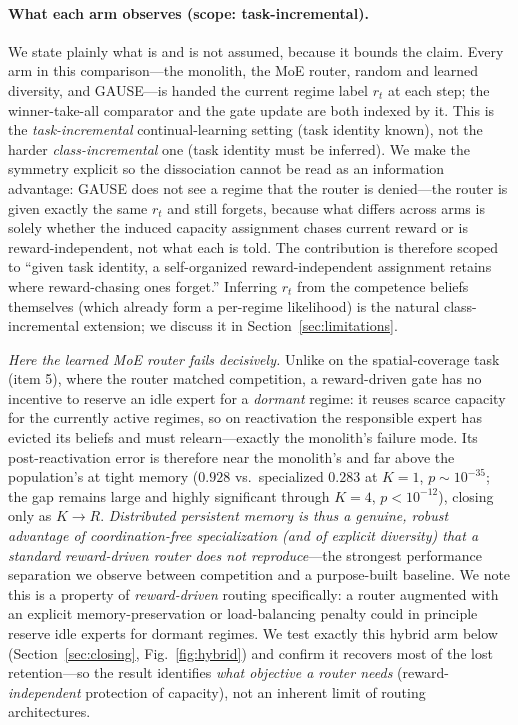 \documentclass{article}
\begin{document}
\paragraph{What each arm observes (scope: task-incremental).} We state plainly
what is and is not assumed, because it bounds the claim. Every arm in this
comparison---the monolith, the MoE router, random and learned diversity, and
GAUSE---is handed the current regime label $r_t$ at each step; the winner-take-all
comparator and the gate update are both indexed by it. This is the
\emph{task-incremental} continual-learning setting (task identity known), not the
harder \emph{class-incremental} one (task identity must be inferred). We make the
symmetry explicit so the dissociation cannot be read as an information advantage:
GAUSE does not see a regime that the router is denied---the router is given exactly
the same $r_t$ and still forgets, because what differs across arms is solely whether
the induced capacity assignment chases current reward or is reward-independent, not
what each is told. The contribution is therefore scoped to ``given task identity, a
self-organized reward-independent assignment retains where reward-chasing ones
forget.'' Inferring $r_t$ from the competence beliefs themselves (which already form
a per-regime likelihood) is the natural class-incremental extension; we discuss it
in Section~\ref{sec:limitations}.

\emph{Here the learned MoE router fails decisively.} Unlike on the spatial-coverage
task (item 5), where the router matched competition, a reward-driven gate has no
incentive to reserve an idle expert for a \emph{dormant} regime: it reuses scarce
capacity for the currently active regimes, so on reactivation the responsible expert
has evicted its beliefs and must relearn---exactly the monolith's failure mode. Its
post-reactivation error is therefore near the monolith's and far above the
population's at tight memory ($0.928$ vs.\ specialized $0.283$ at $K{=}1$,
$p\sim10^{-35}$; the gap remains large and highly significant through $K{=}4$,
$p<10^{-12}$), closing only as $K\to R$. \emph{Distributed persistent memory is thus
a genuine, robust advantage of coordination-free specialization (and of explicit
diversity) that a standard reward-driven router does not reproduce}---the strongest
performance separation we observe between competition and a purpose-built baseline.
We note this is a property of \emph{reward-driven} routing specifically: a router
augmented with an explicit memory-preservation or load-balancing penalty could in
principle reserve idle experts for dormant regimes. We test exactly this hybrid arm
below (Section~\ref{sec:closing}, Fig.~\ref{fig:hybrid}) and confirm it recovers most
of the lost retention---so the result identifies \emph{what objective a router needs}
(reward-\emph{independent} protection of capacity), not an inherent limit of routing
architectures.
\end{document}
